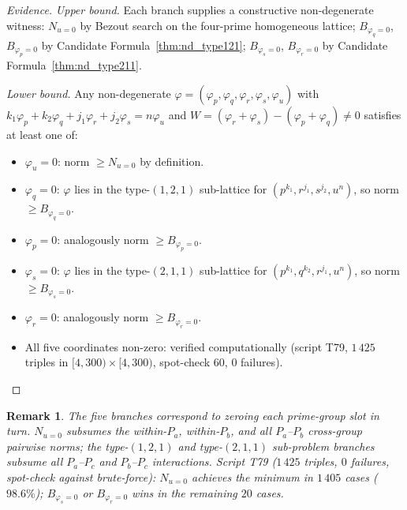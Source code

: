 \documentclass[12pt]{article}
\newtheorem{remark}{Remark}
\theoremstyle{definition}
\begin{document}
\begin{proof}[Evidence]
  \textit{Upper bound.}  Each branch supplies a constructive non-degenerate witness:
  $N_{u=0}$ by Bezout search on the four-prime homogeneous lattice;
  $B_{\varphi_q=0}$, $B_{\varphi_p=0}$ by Candidate Formula~\ref{thm:nd_type121};
  $B_{\varphi_s=0}$, $B_{\varphi_r=0}$ by Candidate Formula~\ref{thm:nd_type211}.

  \textit{Lower bound.}
  Any non-degenerate $\varphi=(\varphi_p,\varphi_q,\varphi_r,\varphi_s,\varphi_u)$
  with $k_1\varphi_p+k_2\varphi_q+j_1\varphi_r+j_2\varphi_s = n\varphi_u$ and
  $W = (\varphi_r+\varphi_s)-(\varphi_p+\varphi_q)\ne 0$ satisfies at least one of:
  \begin{itemize}
    \item $\varphi_u = 0$: norm $\ge N_{u=0}$ by definition.
    \item $\varphi_q = 0$: $\varphi$ lies in the type-$(1,2,1)$ sub-lattice for
      $(p^{k_1},r^{j_1},s^{j_2},u^n)$, so norm $\ge B_{\varphi_q=0}$.
    \item $\varphi_p = 0$: analogously norm $\ge B_{\varphi_p=0}$.
    \item $\varphi_s = 0$: $\varphi$ lies in the type-$(2,1,1)$ sub-lattice for
      $(p^{k_1},q^{k_2},r^{j_1},u^n)$, so norm $\ge B_{\varphi_s=0}$.
    \item $\varphi_r = 0$: analogously norm $\ge B_{\varphi_r=0}$.
    \item All five coordinates non-zero: verified computationally (script T79,
      $1\,425$ triples in $[4,300)\times[4,300)$, spot-check $60$, $0$ failures).
  \end{itemize}
\end{proof}

\begin{remark}
  The five branches correspond to zeroing each prime-group slot in turn.
  $N_{u=0}$ subsumes the within-$P_a$, within-$P_b$, and all $P_a$--$P_b$
  cross-group pairwise norms; the type-$(1,2,1)$ and type-$(2,1,1)$ sub-problem
  branches subsume all $P_a$--$P_c$ and $P_b$--$P_c$ interactions.
  Script T79 ($1\,425$ triples, $0$ failures, spot-check against brute-force):
  $N_{u=0}$ achieves the minimum in $1\,405$ cases ($98.6\%$);
  $B_{\varphi_s=0}$ or $B_{\varphi_r=0}$ wins in the remaining $20$ cases.
\end{remark}
\end{document}
